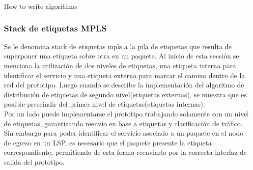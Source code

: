 \newpage
\begin{algorithm}[H]
 
  \caption{How to write algorithms}
\end{algorithm}

\subsubsection{Stack de etiquetas MPLS}
Se le denomina stack de etiquetas mpls a la pila de etiquetas que resulta de superponer una etiqueta sobre otra en un paquete. Al inicio de esta secci\'on se menciona la utilizaci\'on de dos niveles de etiquetas, una etiqueta interna para identificar el servicio y una etiqueta externa para marcar el camino dentro de la red del prototipo. Luego cuando se describe la implementaci\'on del algoritmo de distribución de etiquetas de segundo nivel(etiquetas externas), se muestra que es posible prescindir del primer nivel de etiquetas(etiquetas internas).\\

Por un lado puede implementarse el prototipo trabajando solamente con un nivel de etiquetas, garantizando reenvío en base a etiquetas y clasificaci\'on de tr\'afico. Sin embargo para poder identificar el servicio asociado a un paquete en el nodo de egreso en un LSP, es necesario que el paquete presente la etiqueta correspondiente; permitiendo de esta forma reenviarlo por la correcta interfaz de salida del prototipo. 

